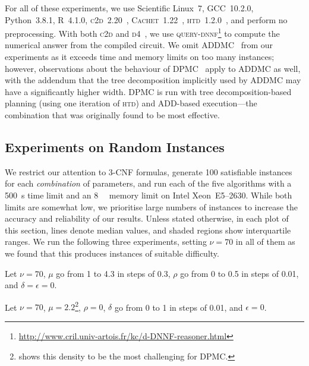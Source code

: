 \documentclass[runningheads]{llncs}
\begin{document}
For all of these experiments, we use Scientific Linux~7, GCC~10.2.0,
Python~3.8.1, R~4.1.0, \textsc{c2d}~2.20~\cite{DBLP:conf/ecai/Darwiche04},
\textsc{Cachet}~1.22~\cite{DBLP:conf/sat/SangBBKP04},
\textsc{htd}~1.2.0~\cite{DBLP:conf/cpaior/AbseherMW17}, and perform no
preprocessing. With both \textsc{c2d} and
\textsc{d4}~\cite{DBLP:conf/ijcai/LagniezM17}, we use
\textsc{query-dnnf}\footnote{\url{http://www.cril.univ-artois.fr/kc/d-DNNF-reasoner.html}}
to compute the numerical answer from the compiled circuit. We omit
\textsc{ADDMC}~\cite{DBLP:conf/aaai/DudekPV20} from our experiments as it
exceeds time and memory limits on too many instances; however, observations
about the behaviour of \textsc{DPMC}~\cite{DBLP:conf/cp/DudekPV20} apply to
\textsc{ADDMC} as well, with the addendum that the tree decomposition implicitly
used by \textsc{ADDMC} may have a significantly higher width. \textsc{DPMC} is
run with tree decomposition-based planning (using one iteration of \textsc{htd})
and ADD-based execution---the combination that was originally found to be most
effective.

\subsection{Experiments on Random Instances}\label{sec:random_experiments}

We restrict our attention to 3-CNF formulas, generate 100 satisfiable instances
for each \emph{combination} of parameters, and run each of the five algorithms
with a \SI{500}{\second} time limit and an \SI{8}{\gibi\byte} memory limit on
Intel Xeon~E5--2630. While both limits are somewhat low, we prioritise large
numbers of instances to increase the accuracy and reliability of our results.
Unless stated otherwise, in each plot of this section, lines denote median
values, and shaded regions show interquartile ranges. We run the following three
experiments, setting $\nu = 70$ in all of them as we found that this produces
instances of suitable difficulty.

\begin{experiment}\label{exp:density}
  Let $\nu = 70$, $\mu$ go from 1 to 4.3 in steps of 0.3, $\rho$ go from 0 to
  0.5 in steps of 0.01, and $\delta = \epsilon = 0$.
\end{experiment}

\begin{experiment}[$\delta$]\label{exp:delta}
  Let $\nu = 70$, $\mu = 2.2$\footnote{ shows this density to
    be the most challenging for \textsc{DPMC}.},
  $\rho = 0$, $\delta$ go from 0 to 1 in steps of 0.01, and $\epsilon = 0$.
\end{experiment}
\end{document}
